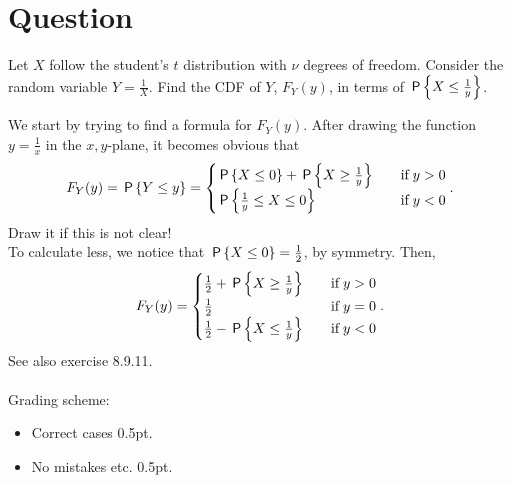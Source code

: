 \section{Question}
\begin{exercise}[1]
Let $X$ follow the student's $t$ distribution with $\nu$ degrees of freedom. Consider the random variable $Y = \frac{1}{X}$. Find the CDF of $Y$, $F_Y(y)$, in terms of $\P{X\leq\frac{1}{y}}$.
\begin{solution}
We start by trying to find a formula for $F_Y(y)$. After drawing the function $y=\frac{1}{x}$ in the $x,y$-plane, it becomes obvious that
\begin{align*}
    F_Y(y) = \P{Y\leq y} = \begin{cases}
    \P{X\leq 0} + \P{X\geq\frac{1}{y}}&\quad\text{if}\;y>0\\
    \P{\frac{1}{y}\leq X\leq 0}&\quad\text{if}\;y<0
    \end{cases}.
\end{align*}
Draw it if this is not clear!\\
To calculate less, we notice that $\P{X\leq 0}=\frac12$, by symmetry. Then,
\begin{align*}
    F_Y(y) = \begin{cases}
    \frac12 + \P{X\geq\frac{1}{y}}&\quad\text{if}\;y>0\\
    \frac12&\quad\text{if}\;y=0\\
    \frac12 - \P{X\leq\frac1y}&\quad\text{if}\;y<0
    \end{cases}.
\end{align*}
See also exercise 8.9.11.
\\\\
Grading scheme:
\begin{itemize}
    \item Correct cases 0.5pt.
    \item No mistakes etc. 0.5pt.
\end{itemize}
\end{solution}
\end{exercise}

